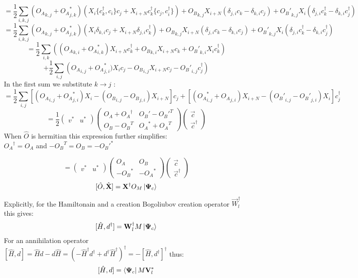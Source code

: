 \documentclass[Master]{subfiles}
\begin{document}
$$
= 
\frac{1}{2}
\sum_{i,k,j}
({O_A}_{k,j} + {O_A}^*_{j,k}) \left(X_i\{c^{\dag}_k ,c_i\}c_j+X_{i+N} c^{\dag}_k \{ c_j,c^{\dag}_i\}\right)
+ {O_B}_{k,j} X_{i+N} (\delta_{j,i} c_k - \delta_{k,i} c_j)
+ {O_B'}_{k,j} X_i (\delta_{j,i} c^{\dag}_k - \delta_{k,i} c^{\dag}_j)
$$
$$
= 
\frac{1}{2}
\sum_{i,k,j}
({O_A}_{k,j} + {O_A}^*_{j,k})\left(X_i\delta_{k,i} c_j+X_{i+N} \delta_{j,i}  c^{\dag}_k \right)
+ {O_B}_{k,j} X_{i+N} (\delta_{j,i} c_k - \delta_{k,i} c_j)
+ {O_B'}_{k,j} X_i (\delta_{j,i} c^{\dag}_k - \delta_{k,i} c^{\dag}_j)
$$
$$
= 
\frac{1}{2}
\sum_{i,k}\left(
({O_A}_{k,i} + {O_A}^*_{i,k}) X_{i+N}  c^{\dag}_k 
+{O_B}_{k,i} X_{i+N}  c_k 
+ {O_B'}_{k,i} X_i c^{\dag}_k\right)
$$
$$
+\frac{1}{2}\sum_{i,j } \left({O_A}_{i,j} + {O_A}^*_{j,i})X_i c_j
-  {O_B}_{i,j} X_{i+N}  c_j
- {O_B'}_{i,j} c^{\dag}_j \right)
$$
In the first sum we substitute $k \rightarrow j$ :
$$
= 
\frac{1}{2}
\sum_{i,j}
\left[({O_A}_{i,j} + {O_A}^*_{j,i}) X_i
- ({O_B}_{i,j} - {O_B}_{j,i}) X_{i+N} \right]  c_j 
+ \left[ ( {O_A}^*_{i,j}+ {O_A}_{j,i} ) X_{i+N} 
- ( {O_B'}_{i,j} - {O_B'}_{j,i} ) X_i \right]  c^{\dag}_j 
$$
$$
= 
\frac{1}{2}
\left(
\begin{array}{c|c}
      v^* & u^*
\end{array}
\right)
\left(
\begin{array}{c|c}
{O_A} + {O_A}^{\dag} &  {O_B'} - {O_B'}^T\\
\hline
{O_B} - {O_B}^T &  {O_A}^*+ {O_A}^T 
\end{array}
\right) 
\left(
\begin{array}{c}
\vec{c}\\
\hline
\vec{c}^{\dag}
\end{array}
\right) $$
When $\hat{O}$ is hermitian this expression further simplifies:\\
${O_A}^{\dag} = {O_A}$ and $- {O_B}^{T} = {O_B}= -{O_B'}^*$

$$
= 
\left(
\begin{array}{c|c}
      v^* & u^*
\end{array}
\right)\left(
\begin{array}{c|c}
{O_A} &  {O_B}\\
\hline
-{O_B}^*& -{O_A}^*
\end{array}
\right)
\left(
\begin{array}{c}
\vec{c}\\
\hline
\vec{c}^{\dag}
\end{array}
\right) $$
\begin{dmath}\label{math:CommutatorLemma}
[\hat{O},\hat{\vec{X}}] = \vec{X}^{\dag}O_M\ket{\vec{\Psi}_c} 
\end{dmath}
Explicitly, for the Hamiltonain and a creation Bogoliubov creation operator $\vec{W}_l^{\dag}$ this gives:
\begin{dmath}\label{math:CommutatorHd+}
 [\hat{H},d^{\dag}]= \vec{W}_l^{\dag} M \ket{\vec{\Psi}_c}
\end{dmath}
For an annihilation operator  $[\hat{H},d]= \hat{H}d-d\hat{H} = (-\hat{H}^{\dag}d^{\dag}+d^{\dag}\hat{H}^{\dag})^{\dag} = -[\hat{H},d^{\dag}]^{\dag}$ thus:\\
\begin{dmath}\label{math:CommutatorHd}
 [\hat{H},d] = \bra{\vec{\Psi}_c} M \vec{V}^*_l
\end{dmath}
\end{document}
